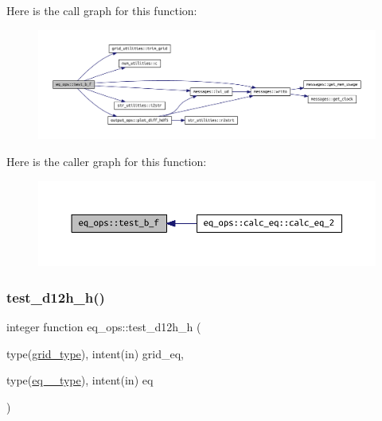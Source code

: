 Here is the call graph for this function\+:
\nopagebreak
\begin{figure}[H]
\begin{center}
\leavevmode
\includegraphics[width=350pt]{namespaceeq__ops_a8082c12510696bd8ffdd0deef41860c2_cgraph}
\end{center}
\end{figure}
Here is the caller graph for this function\+:
\nopagebreak
\begin{figure}[H]
\begin{center}
\leavevmode
\includegraphics[width=350pt]{namespaceeq__ops_a8082c12510696bd8ffdd0deef41860c2_icgraph}
\end{center}
\end{figure}
\mbox{\label{namespaceeq__ops_a003df1e1ab90dc6f586c3eed3dd067e8}} 
\subsubsection{\texorpdfstring{test\+\_\+d12h\+\_\+h()}{test\_d12h\_h()}}
{\footnotesize\ttfamily integer function eq\+\_\+ops\+::test\+\_\+d12h\+\_\+h (\begin{DoxyParamCaption}\item[{type(\hyperlink{structgrid__vars_1_1grid__type}{grid\+\_\+type}), intent(in)}]{grid\+\_\+eq,  }\item[{type(\hyperlink{structeq__vars_1_1eq__2__type}{eq\+\_\+2\+\_\+type}), intent(in)}]{eq }\end{DoxyParamCaption})}



